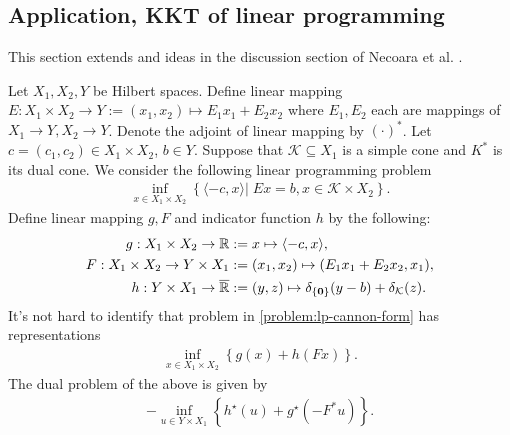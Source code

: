 \documentclass[12pt]{report}
\begin{document}
        \subsection{Application, KKT of linear programming}
            This section extends and ideas in the discussion section of Necoara et al. \cite{necoara_linear_2019}. 
            \par
            Let $X_1, X_2, Y$ be Hilbert spaces. 
            Define linear mapping $E:X_1 \times X_2 \rightarrow Y := (x_1, x_2)\mapsto E_1 x_1 + E_2 x_2$ where $E_1, E_2$ each are mappings of $X_1 \rightarrow Y, X_2 \rightarrow Y$. 
            Denote the adjoint of linear mapping by $(\cdot)^*$. 
            Let $c = (c_1, c_2) \in X_1 \times X_2$, $b \in Y$. 
            Suppose that $\mathcal K \subseteq X_1$ is a simple cone and $K^*$ is its dual cone. 
            We consider the following linear programming problem 
            \begin{align}\label{problem:lp-cannon-form}
                \inf_{x \in X_1\times X_2}\left\lbrace
                    \langle - c, x\rangle
                    \left| \;
                        Ex = b, x \in \mathcal K \times X_2
                    \right.
                \right\rbrace. 
            \end{align}
            Define linear mapping $g, F$ and indicator function $h$ by the following: 
            \begin{align*}
                g:X_1\times X_2 \rightarrow \mathbb R 
                    &:= x \mapsto \langle - c, x\rangle, 
                \\
                F: X_1\times X_2 \rightarrow Y \times X_1 
                    &:= (x_1, x_2) \mapsto (E_1x_1 + E_2 x_2, x_1),
                \\
                h: Y \times X_1 \rightarrow \overline {\mathbb R} &:= 
                    (y, z) \mapsto \delta_{\{\mathbf 0\}}(y - b) + \delta_{\mathcal K}(z). 
            \end{align*}
            It's not hard to identify that problem in \eqref{problem:lp-cannon-form} has representations 
            \begin{align*}
                \inf_{x \in X_1\times X_2}
                \left\lbrace
                    g(x) + h(Fx)
                \right\rbrace. 
            \end{align*}
            The dual problem of the above is given by
            \begin{align*}
                -\inf_{u \in Y\times X_1}
                \left\lbrace
                    h^\star(u) + g^\star(-F^* u)
                \right\rbrace. 
            \end{align*}
\end{document}
